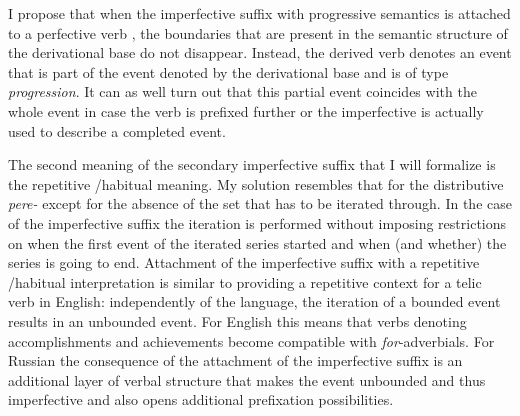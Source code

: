 I propose that when the imperfective suffix   with progressive semantics is attached to a perfective verb , the boundaries that are present in the semantic structure of the derivational base do not disappear. Instead, the derived verb denotes an event that is part of the event denoted by the derivational base and is of type \textit{progression}. It can as well turn out that this partial event coincides with the whole event in case the verb is prefixed further or the imperfective is actually used to describe a completed event.


The second meaning of the secondary imperfective  suffix that I will formalize is the repetitive /habitual meaning. My solution resembles that for the distributive  \textit{pere-}   except for the absence of the set that has to be iterated through. In the case of the imperfective suffix   the iteration is performed without imposing restrictions on when the first event of the iterated series started and when (and whether) the series is going to end. Attachment of the imperfective suffix   with a repetitive /habitual interpretation is similar to providing a repetitive  context   for a telic verb in English: independently of the language, the iteration of a bounded event results in an unbounded event. For English this means that verbs denoting accomplishments and achievements become compatible with \textit{for}-adverbials. For Russian the consequence of the attachment of the imperfective suffix   is an additional layer of verbal structure that makes the event unbounded and thus imperfective and also opens additional prefixation  possibilities. 

